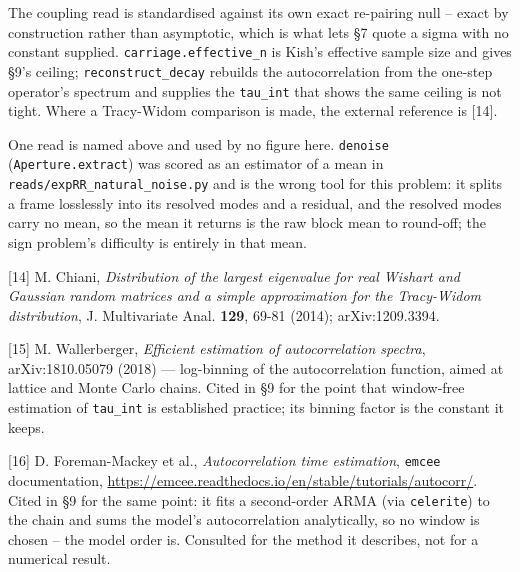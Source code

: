 \documentclass[10pt,letterpaper,twocolumn]{article}
\begin{document}
The coupling read is standardised against its own exact re-pairing null -- exact by construction
rather than asymptotic, which is what lets §7 quote a sigma with no constant supplied.
\texttt{carriage.\allowbreak{}effective\_\allowbreak{}n} is Kish's effective sample size and gives §9's ceiling;
\texttt{reconstruct\_\allowbreak{}decay} rebuilds the autocorrelation from the one-step operator's spectrum and supplies
the \texttt{tau\_\allowbreak{}int} that shows the same ceiling is not tight. Where a Tracy-Widom comparison is made,
the external reference is {[}14{]}.

One read is named above and used by no figure here. \texttt{denoise} (\texttt{Aperture.\allowbreak{}extract}) was scored as
an estimator of a mean in \texttt{reads/\allowbreak{}expRR\_\allowbreak{}natural\_\allowbreak{}noise.\allowbreak{}py} and is the wrong tool for this problem:
it splits a frame losslessly into its resolved modes and a residual, and the resolved modes carry
no mean, so the mean it returns is the raw block mean to round-off; the sign problem's difficulty
is entirely in that mean.

{[}14{]} M. Chiani, \emph{Distribution of the largest eigenvalue for real Wishart and Gaussian random
matrices and a simple approximation for the Tracy-Widom distribution}, J. Multivariate Anal.
\textbf{129}, 69-81 (2014); arXiv:1209.3394.

{[}15{]} M. Wallerberger, \emph{Efficient estimation of autocorrelation spectra}, arXiv:1810.05079 (2018)
--- log-binning of the autocorrelation function, aimed at lattice and Monte Carlo chains. Cited in
§9 for the point that window-free estimation of \texttt{tau\_\allowbreak{}int} is established practice; its binning
factor is the constant it keeps.

{[}16{]} D. Foreman-Mackey et al., \emph{Autocorrelation time estimation}, \texttt{emcee} documentation,
\href{https://emcee.readthedocs.io/en/stable/tutorials/autocorr/}{https:\allowbreak{}/\allowbreak{}/\allowbreak{}emcee.\allowbreak{}readthed\allowbreak{}ocs.\allowbreak{}io/\allowbreak{}en/\allowbreak{}stable/\allowbreak{}tutorial\allowbreak{}s/\allowbreak{}autocorr\allowbreak{}/}. Cited in §9 for the same point: it
fits a second-order ARMA (via \texttt{celerite}) to the chain and sums the model's autocorrelation
analytically, so no window is chosen -- the model order is. Consulted for the method it
describes, not for a numerical result.
\end{document}
